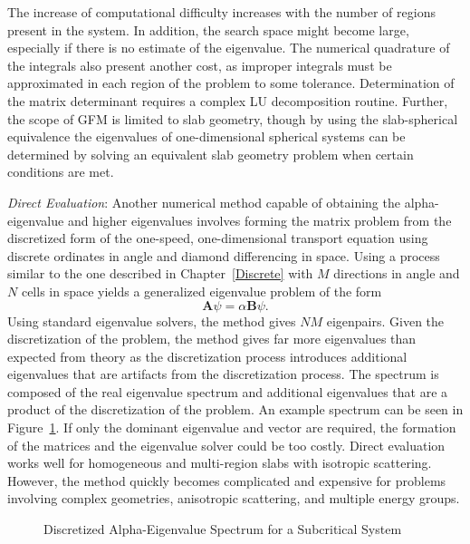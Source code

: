 The increase of computational difficulty increases with the number of regions present in the system. In addition, the search space might become large, especially if there is no estimate of the eigenvalue. The numerical quadrature of the integrals also present another cost, as improper integrals must be approximated in each region of the problem to some tolerance. Determination of the matrix determinant requires a complex LU decomposition routine. Further, the scope of GFM is limited to slab geometry, though by using the slab-spherical equivalence \cite{case1953introduction} the eigenvalues of one-dimensional spherical systems can be determined by solving an equivalent slab geometry problem when certain conditions are met.

\textit{Direct Evaluation}: Another numerical method capable of obtaining the alpha-eigen\-value and higher eigenvalues involves forming the matrix problem from the discretized form of the one-speed, one-dimensional transport equation \cite{modak_simple_2003} using discrete ordinates in angle and diamond differencing in space. Using a process similar to the one described in Chapter~\ref{Discrete} with $M$ directions in angle and $N$ cells in space yields a generalized eigenvalue problem of the form
\begin{equation}
\mathbf{A} \psi = \alpha \mathbf{B} \psi.
\label{eq:geneig}
\end{equation}
Using standard eigenvalue solvers, the method gives $NM$ eigenpairs. Given the discretization of the problem, the method gives far more eigenvalues than expected from theory as the discretization process introduces additional eigenvalues that are artifacts from the discretization process. The spectrum is composed of the real eigenvalue spectrum and additional eigenvalues that are a product of the discretization of the problem. An example spectrum can be seen in Figure~\ref{fig:NMSpec}. If only the dominant eigenvalue and vector are required, the formation of the matrices and the eigenvalue solver could be too costly. Direct evaluation works well for homogeneous and multi-region slabs with isotropic scattering. However, the method quickly becomes complicated and expensive for problems involving complex geometries, anisotropic scattering, and multiple energy groups.

\begin{figure}
\centering
\resizebox{0.5\textwidth}{!}{
	
	}
	\caption{Discretized Alpha-Eigenvalue Spectrum for a Subcritical System}
	\label{fig:NMSpec}
\end{figure}

